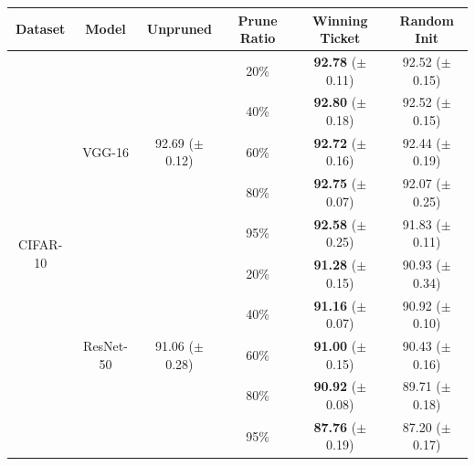 \begin{table}[!htbp]
\begin{subtable}[b]{\textwidth}
\vspace{2ex}
\label{subtable-3}
\end{subtable}
\vspace{2ex}
\begin{subtable}[b]{\textwidth}
\centering
\small
\begin{tabular}{c|c|cccc}
\hline
Dataset                    & Model                   & Unpruned          & Prune Ratio & Winning Ticket       & Random Init          \\ \hline
\multirow{10}{*}{CIFAR-10} & \multirow{5}{*}{VGG-16} & \multirow{5}{*}{92.69 ($\pm$0.12)}  & 20\%        & \textbf{92.78} ($\pm$0.11)           & 92.52 ($\pm$0.15)           \\
                           &                         &             & 40\%        & \textbf{92.80} ($\pm$0.18)           & 92.52 ($\pm$0.15)           \\
                           &                         &               & 60\%       & \textbf{92.72} ($\pm$0.16)           & 92.44 ($\pm$0.19)           \\
 &                         &               & 80\%       & \textbf{92.75} ($\pm$0.07)           & 92.07 ($\pm$0.25)           \\
  &                         &               & 95\%       & \textbf{92.58} ($\pm$0.25)           & 91.83 ($\pm$0.11)           \\ \cline{2-6} & \multirow{5}{*}{ResNet-50} & \multirow{5}{*}{91.06 ($\pm$0.28)}   & 20\%        & \textbf{91.28} ($\pm$0.15)           & 90.93 ($\pm$0.34)           \\
                           &                         &             & 40\%        & \textbf{91.16} ($\pm$0.07)           & 90.92 ($\pm$0.10)           \\
                           &                         &               & 60\%       & \textbf{91.00} ($\pm$0.15)           & 90.43 ($\pm$0.16)           \\
 &                         &               & 80\%       & \textbf{90.92} ($\pm$0.08)           & 89.71 ($\pm$0.18) \\
  &                         &               & 95\%       & \textbf{87.76} ($\pm$0.19)           & 87.20 ($\pm$0.17) \\ \hline

\end{tabular}
\end{subtable}
\end{table}
